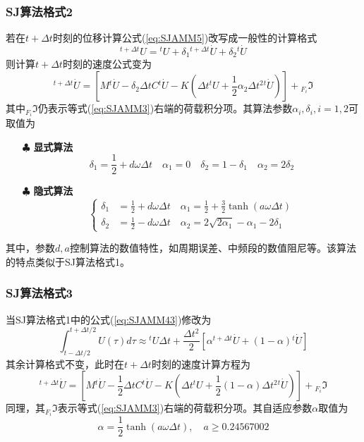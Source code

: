 \subsubsection{SJ算法格式2\cite{Jr2014}}
若在$t+\Delta t$时刻的位移计算公式(\ref{eq:SJAMM5})改写成一般性的计算格式
\begin{equation}
{^{t+\Delta t}\!U}={^t\!U}+\delta_1{^{t+\Delta t}\!\dot{U}}+\delta_2{^{t}\!\dot{U}}
\end{equation}
则计算$t+\Delta t$时刻的速度公式变为
\begin{equation}
[M+\delta_1\Delta tC+\frac{1}{2}\alpha_1\Delta t^2K]{^{t+\Delta t}\!\dot{U}}=[M{^t\!\dot{U}}-\delta_2\Delta tC{^t\!\dot{U}}-K(\Delta t{^t\!U}+\frac{1}{2}\alpha_2\Delta t^2{^t\!\dot{U}})]+{_{F_i}\!\Im}
\end{equation}
其中${_{F_i}\!\Im}$仍表示等式(\ref{eq:SJAMM3})右端的荷载积分项。其算法参数$\alpha_i,\delta_i,i = 1,2$可取值为
\begin{itemize}
\item[$\clubsuit$] \textbf{显式算法}
\begin{equation}
\delta_1 = \frac12+d\omega\Delta t\quad\alpha_1=0\quad\delta_2=1-\delta_1\quad\alpha_2=2\delta_2
\end{equation}
\item[$\clubsuit$] \textbf{隐式算法}
\begin{equation}
\left\{
\begin{aligned}
\delta_1 &= \frac12+d\omega\Delta t\quad\alpha_1=\frac12+\frac{3}{2}\tanh(a\omega\Delta t)\\
\delta_2& =\frac12-d\omega\Delta t\quad\alpha_2=2\sqrt{2\alpha_1}-\alpha_1-2\delta_1
\end{aligned}\right.
\end{equation}
\end{itemize}
其中，参数$d,a$控制算法的数值特性，如周期误差、中频段的数值阻尼等。该算法的特点类似于SJ算法格式1。

\subsubsection{SJ算法格式3\cite{Soares2015}}
当SJ算法格式1\cite{SoaresJr2016}中的公式(\ref{eq:SJAMM43})修改为
\begin{equation}
\int_{t-\Delta t/2}^{t+\Delta t/2}{U}(\tau)d\tau\approx{^t\!U}\Delta t+\frac{\Delta t^2}{2}[\alpha{^{t+\Delta t}\!\dot{U}}+(1-\alpha){^{t}\!\dot{U}}]
\end{equation}
其余计算格式不变，此时在$t+\Delta t$时刻的速度计算方程为
\begin{equation}
[M+\frac{1}{2}\Delta tC+\frac{1}{2}\alpha\Delta t^2K]{^{t+\Delta t}\!\dot{U}}=[M{^t\!\dot{U}}-\frac{1}{2}\Delta tC{^t\!\dot{U}}-K(\Delta t{^t\!U}+\frac{1}{2}(1-\alpha)\Delta t^2{^t\!\dot{U}})]+{_{F_i}\!\Im}
\end{equation}
同理，其${_{F_i}\!\Im}$表示等式(\ref{eq:SJAMM3})右端的荷载积分项。其自适应参数$\alpha$取值为
\begin{equation}
\alpha=\frac{1}{2}\tanh(a\omega\Delta t),\quad a\ge0.24567002
\end{equation}

